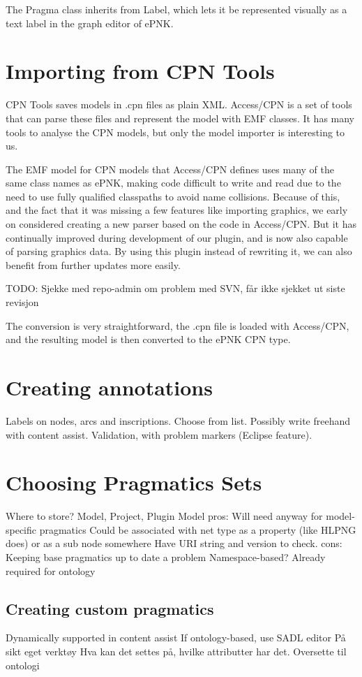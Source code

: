 
The Pragma class inherits from Label, which lets it be represented visually as a
text label in the graph editor of ePNK.


\section{Importing from CPN Tools}
CPN Tools saves models in .cpn files as plain XML. Access/CPN is a set of tools
that can parse these files and represent the model with EMF classes. It has many
tools to analyse the CPN models, but only the model importer is interesting to
us.

The EMF model for CPN models that Access/CPN defines uses many of the same class
names as ePNK, making code difficult to write and read due to the need to use
fully qualified classpaths to avoid name collisions. Because of this, and the
fact that it was missing a few features like importing graphics, we early on
considered creating a new parser based on the code in Access/CPN. But it has
continually improved during development of our plugin, and is now also capable
of parsing graphics data. By using this plugin instead of rewriting it, we can
also benefit from further updates more easily.

TODO: Sjekke med repo-admin om problem med SVN, får ikke sjekket ut siste
revisjon

The conversion is very straightforward, the .cpn file is loaded with Access/CPN,
and the resulting model is then converted to the ePNK CPN type.

\section{Creating annotations}
Labels on nodes, arcs and inscriptions. 
Choose from list. Possibly write freehand with content assist. Validation, with
problem markers (Eclipse feature).

\section{Choosing Pragmatics Sets}
Where to store? Model, Project, Plugin
Model pros:
	Will need anyway for model-specific pragmatics
	Could be associated with net type as a property (like HLPNG does) or as a sub
	node somewhere
	Have URI string and version to check.
cons:
	Keeping base pragmatics up to date a problem
Namespace-based? Already required for ontology


	\subsection{Creating custom pragmatics}
	Dynamically supported in content assist 
	If ontology-based, use SADL editor
	På sikt eget verktøy
		Hva kan det settes på, hvilke attributter har det.
		Oversette til ontologi

